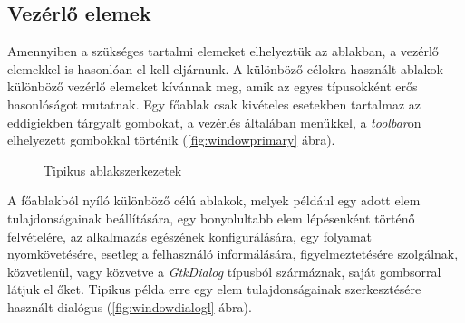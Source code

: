 \subsection{Vezérlő elemek}
\label{sec:windowvsdialog}

Amennyiben a szükséges tartalmi elemeket elhelyeztük az ablakban, a vezérlő elemekkel is hasonlóan el kell eljárnunk. A különböző célokra használt ablakok különböző vezérlő elemeket kívánnak meg, amik az egyes típusokként erős hasonlóságot mutatnak. Egy főablak csak kivételes esetekben tartalmaz az eddigiekben tárgyalt gombokat, a vezérlés általában menükkel, a \textit{toolbar}on elhelyezett gombokkal történik (\ref{fig:windowprimary} ábra).

\begin{figure}[H]
\begin{center}
\hspace{12pt}
\caption{Tipikus ablakszerkezetek}
\end{center}
\end{figure}

A főablakból nyíló különböző célú ablakok, melyek például egy adott elem tulajdonságainak beállítására, egy bonyolultabb elem lépésenként történő felvételére, az alkalmazás egészének konfigurálására, egy folyamat nyomkövetésére, esetleg a felhasználó informálására, figyelmeztetésére szolgálnak, közvetlenül, vagy közvetve a \textit{GtkDialog} típusból szármáznak, saját gombsorral látjuk el őket. Tipikus példa erre egy elem tulajdonságainak szerkesztésére használt dialógus (\ref{fig:windowdialogl} ábra).

